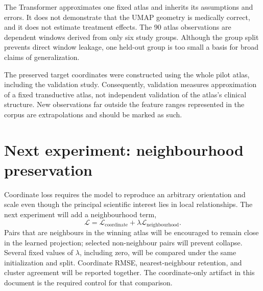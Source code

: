 \documentclass[12pt]{article}
\begin{document}
The Transformer approximates one fixed atlas and inherits its assumptions and
errors.  It does not demonstrate that the UMAP geometry is medically correct, and
it does not estimate treatment effects.  The 90 atlas observations are dependent
windows derived from only six study groups.  Although the group split prevents
direct window leakage, one held-out group is too small a basis for broad claims of
generalization.

The preserved target coordinates were constructed using the whole pilot atlas,
including the validation study.  Consequently, validation measures approximation
of a fixed transductive atlas, not independent validation of the atlas's clinical
structure.  New observations far outside the feature ranges represented in the
corpus are extrapolations and should be marked as such.

\section{Next experiment: neighbourhood preservation}

Coordinate loss requires the model to reproduce an arbitrary orientation and
scale even though the principal scientific interest lies in local relationships.
The next experiment will add a neighbourhood term,
\[
  \mathcal{L}=\mathcal{L}_{\mathrm{coordinate}}
  +\lambda\mathcal{L}_{\mathrm{neighbourhood}}.
\]
Pairs that are neighbours in the winning atlas will be encouraged to remain close
in the learned projection; selected non-neighbour pairs will prevent collapse.
Several fixed values of $\lambda$, including zero, will be compared under the same
initialization and split.  Coordinate RMSE, nearest-neighbour retention, and
cluster agreement will be reported together.  The coordinate-only artifact in
this document is the required control for that comparison.



\end{document}
